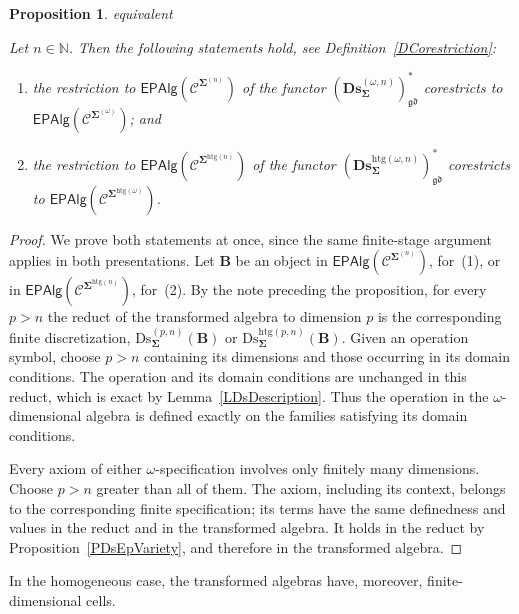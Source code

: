 \documentclass[a4paper, reqno]{amsbook}
\makeatletter
\newcommand{\sig}[1]{\mathbf{#1}}             %
\newcommand{\spec}[1]{\boldsymbol{\mathcal{#1}}} %
\newcommand{\gd}{\mathfrak{gd}}              %
\newcommand{\htg}{\mathrm{htg}}                %
\newcommand{\Ds}{\mathrm{Ds}}
\newcommand{\bDs}{\mathbf{Ds}}
\theoremstyle{plain}
\newtheorem{proposition}[theorem]{Proposition}
\theoremstyle{definition}
\newcommand*{\CA@leanpending}{}
\newcommand*{\CA@leanrelation}{}
\newcommand*{\lean}[2]{%
  \ifcsname\string\color@lean@#1\endcsname\else
    \PackageError{main}{Unknown relation `#1' in \string\lean}{Use equivalent, weaker or stronger.}%
  \fi
  \gdef\CA@leanrelation{#1}%
  \gdef\CA@leanpending{#2}}
\makeatother
\begin{document}
\begin{proposition}\label{PDsEpVarietyOmega}\lean{equivalent}{Dimensions.homogeneousOmegaDiscretization_isModel,Dimensions.heterogeneousOmegaDiscretization_isModel}
Let $n\in\mathbb{N}$.
Then the following statements hold, see Definition~\ref{DCorestriction}:
\begin{enumerate}
\item the restriction to $\mathsf{EPAlg}(\spec{C}^{\sig{\Sigma}^{(n)}})$ of the functor $(\bDs^{(\omega,n)}_{\sig{\Sigma}})^{\ast}_{\gd}$ corestricts to $\mathsf{EPAlg}(\spec{C}^{\sig{\Sigma}^{(\omega)}})$; and
\item the restriction to $\mathsf{EPAlg}(\spec{C}^{\sig{\Sigma}^{\htg(n)}})$ of the functor $(\bDs^{\htg(\omega,n)}_{\sig{\Sigma}})^{\ast}_{\gd}$ corestricts to $\mathsf{EPAlg}(\spec{C}^{\sig{\Sigma}^{\htg(\omega)}})$.
\end{enumerate}
\end{proposition}
\begin{proof}
We prove both statements at once, since the same finite-stage argument applies in both presentations.
Let $\mathbf{B}$ be an object in $\mathsf{EPAlg}(\spec{C}^{\sig{\Sigma}^{(n)}})$, for~(1), or in $\mathsf{EPAlg}(\spec{C}^{\sig{\Sigma}^{\htg(n)}})$, for~(2).
By the note preceding the proposition, for every $p>n$ the reduct of the transformed algebra to dimension $p$ is the corresponding finite discretization, $\Ds^{(p,n)}_{\sig{\Sigma}}(\mathbf{B})$ or $\Ds^{\htg(p,n)}_{\sig{\Sigma}}(\mathbf{B})$.
Given an operation symbol, choose $p>n$ containing its dimensions and those occurring in its domain conditions.
The operation and its domain conditions are unchanged in this reduct, which is exact by Lemma~\ref{LDsDescription}.
Thus the operation in the $\omega$-dimensional algebra is defined exactly on the families satisfying its domain conditions.

Every axiom of either $\omega$-specification involves only finitely many dimensions.
Choose $p>n$ greater than all of them.
The axiom, including its context, belongs to the corresponding finite specification; its terms have the same definedness and values in the reduct and in the transformed algebra.
It holds in the reduct by Proposition~\ref{PDsEpVariety}, and therefore in the transformed algebra.
\end{proof}

In the homogeneous case, the transformed algebras have, moreover, finite-dimensional cells.
\end{document}
